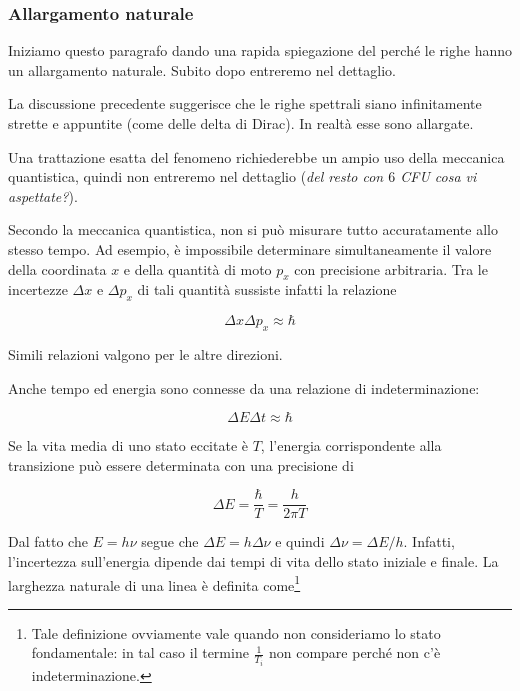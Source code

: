 \subsubsection{Allargamento naturale}

Iniziamo questo paragrafo dando una rapida spiegazione del perché le righe hanno un allargamento naturale. Subito dopo entreremo nel dettaglio.

\vspace{0.2cm}La discussione precedente suggerisce che le righe spettrali siano infinitamente strette e appuntite (come delle delta di Dirac). In realtà esse sono allargate.

Una trattazione esatta del fenomeno richiederebbe un ampio uso della meccanica quantistica, quindi non entreremo nel dettaglio (\textit{del resto con $6$ CFU cosa vi aspettate?}).

Secondo la meccanica quantistica, non si può misurare tutto accuratamente allo stesso tempo. Ad esempio, è impossibile determinare simultaneamente il valore della coordinata $x$ e della quantità di moto $p_x$ con precisione arbitraria. Tra le incertezze $\Delta x$ e $\Delta p_x$ di tali quantità sussiste infatti la relazione

\begin{equation*}
  \Delta x \Delta p_x \approx \hbar
\end{equation*}

Simili relazioni valgono per le altre direzioni.

Anche tempo ed energia sono connesse da una relazione di indeterminazione:

\begin{equation*}
  \Delta E \Delta t \approx \hbar
\end{equation*}

Se la vita media di uno stato eccitate è $T$, l'energia corrispondente alla transizione può essere determinata con una precisione di

\begin{equation*}
  \Delta E=\frac{\hbar}{T}=\frac{h}{2 \pi T}
\end{equation*}

Dal fatto che $E=h \nu$ segue che $\Delta E=h \Delta \nu$ e quindi $\Delta \nu=\Delta E/h$. Infatti, l'incertezza sull'energia dipende dai tempi di vita dello stato iniziale e finale. La larghezza naturale di una linea è definita come\footnote{Tale definizione ovviamente vale quando non consideriamo lo stato fondamentale: in tal caso il termine $\frac{1}{T_i}$ non compare perché non c'è indeterminazione.}

